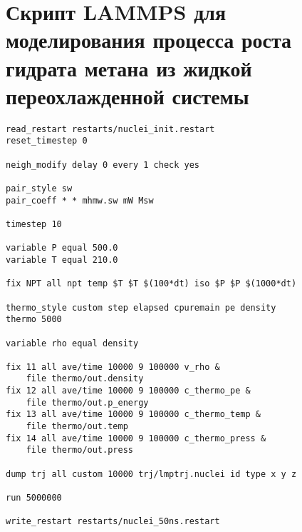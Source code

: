 \section*{Скрипт LAMMPS для моделирования процесса роста гидрата метана из жидкой переохлажденной системы}
\begin{lstlisting}[basicstyle=\ttfamily]
read_restart restarts/nuclei_init.restart
reset_timestep 0

neigh_modify delay 0 every 1 check yes

pair_style sw
pair_coeff * * mhmw.sw mW Msw

timestep 10

variable P equal 500.0
variable T equal 210.0

fix NPT all npt temp $T $T $(100*dt) iso $P $P $(1000*dt)

thermo_style custom step elapsed cpuremain pe density
thermo 5000

variable rho equal density

fix 11 all ave/time 10000 9 100000 v_rho &
    file thermo/out.density
fix 12 all ave/time 10000 9 100000 c_thermo_pe &
    file thermo/out.p_energy
fix 13 all ave/time 10000 9 100000 c_thermo_temp &
    file thermo/out.temp
fix 14 all ave/time 10000 9 100000 c_thermo_press &
    file thermo/out.press

dump trj all custom 10000 trj/lmptrj.nuclei id type x y z

run 5000000

write_restart restarts/nuclei_50ns.restart

\end{lstlisting}


